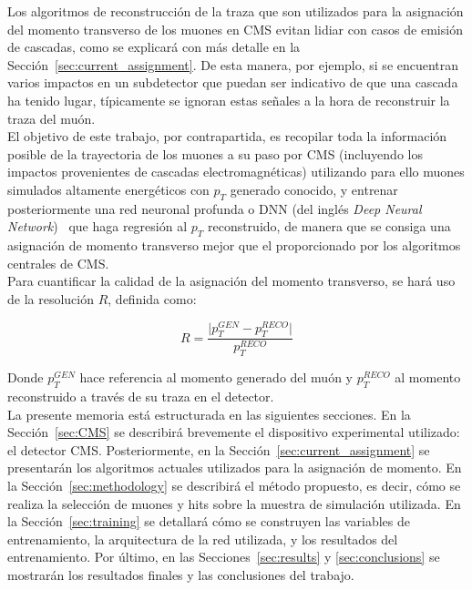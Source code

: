 Los algoritmos de reconstrucci\'on de la traza que son utilizados para la asignaci\'on del momento transverso de los muones en CMS evitan lidiar con casos de emisi\'on de cascadas, como se explicar\'a con m\'as detalle en la Secci\'on~\ref{sec:current_assignment}. De esta manera, por ejemplo, si se encuentran varios impactos en un subdetector que puedan ser indicativo de que una cascada ha tenido lugar, t\'ipicamente se ignoran estas se\~nales a la hora de reconstruir la traza del mu\'on. \\
El objetivo de este trabajo, por contrapartida, es recopilar toda la informaci\'on posible de la trayectoria de los muones a su paso por CMS (incluyendo los impactos provenientes de cascadas electromagn\'eticas) utilizando para ello muones simulados altamente energ\'eticos con $p_{T}$ generado conocido, y entrenar posteriormente una red neuronal profunda o DNN (del ingl\'es \textit{Deep Neural Network})~\cite{Schmidhuber:2015} que haga regresi\'on al $p_{T}$ reconstruido, de manera que se consiga una asignaci\'on de momento transverso mejor que el proporcionado por los algoritmos centrales de CMS. \\

Para cuantificar la calidad de la asignaci\'on del momento transverso, se har\'a uso de la resoluci\'on $R$, definida como:

\begin{equation}
  R = \dfrac{\lvert p_{T}^{GEN} - p_{T}^{RECO}\rvert}{p_{T}^{RECO}}
\label{eq:R}
\end{equation}

Donde $p_{T}^{GEN}$ hace referencia al momento generado del mu\'on y $p_{T}^{RECO}$ al momento reconstruido a trav\'es de su traza en el detector. \\

La presente memoria est\'a estructurada en las siguientes secciones. En la Secci\'on~\ref{sec:CMS} se describir\'a brevemente el dispositivo experimental utilizado: el detector CMS. Posteriormente, en la Secci\'on~\ref{sec:current_assignment} se presentar\'an los algoritmos actuales utilizados para la asignaci\'on de momento. En la Secci\'on~\ref{sec:methodology} se describir\'a el m\'etodo propuesto, es decir, c\'omo se realiza la selecci\'on de muones y hits sobre la muestra de simulaci\'on utilizada. En la Secci\'on~\ref{sec:training} se detallar\'a c\'omo se construyen las variables de entrenamiento, la arquitectura de la red utilizada, y los resultados del entrenamiento. Por \'ultimo, en las Secciones~\ref{sec:results} y \ref{sec:conclusions} se mostrar\'an los resultados finales y las conclusiones del trabajo.
